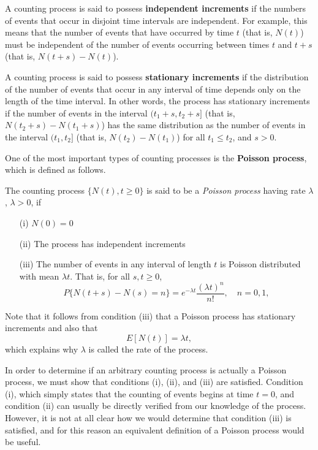 \documentclass[lang=cn,10pt]{elegantbook}
\begin{document}
A counting process is said to possess \textbf{independent increments} if the numbers of events that occur in disjoint time intervals are independent. For example, this means that the number of events that have occurred by time \(t\) (that is, \(N(t)\)) must be independent of the number of events occurring between times \(t\) and \(t + s\) (that is, \(N(t + s) - N(t)\)).

A counting process is said to possess \textbf{stationary increments} if the distribution of the number of events that occur in any interval of time depends only on the length of the time interval. In other words, the process has stationary increments if the number of events in the interval \((t_1 + s, t_2 + s]\) (that is, \(N(t_2 + s) - N(t_1 + s)\)) has the same distribution as the number of events in the interval \((t_1, t_2]\) (that is, \(N(t_2) - N(t_1)\)) for all \(t_1 \leq t_2\), and \(s > 0\).

One of the most important types of counting processes is the \textbf{Poisson process}, which is defined as follows.
\begin{definition}
The counting process $\{N(t), t \geq 0\}$ is said to be a \textit{Poisson process} having rate $\lambda$, $\lambda > 0$, if

\begin{itemize}
    \item[(i)] $N(0) = 0$
    \item[(ii)] The process has independent increments
    \item[(iii)] The number of events in any interval of length $t$ is Poisson distributed with mean $\lambda t$. That is, for all $s, t \geq 0$,
    \begin{equation}
    P\{N(t+s) - N(s) = n\} = e^{-\lambda t} \frac{(\lambda t)^n}{n!}, \quad n = 0, 1,
    \end{equation}
\end{itemize}
\end{definition}

Note that it follows from condition (iii) that a Poisson process has stationary increments and also that
\[
E[N(t)] = \lambda t,
\]
which explains why \(\lambda\) is called the rate of the process.

In order to determine if an arbitrary counting process is actually a Poisson process, we must show that conditions (i), (ii), and (iii) are satisfied. Condition (i), which simply states that the counting of events begins at time \(t = 0\), and condition (ii) can usually be directly verified from our knowledge of the process. However, it is not at all clear how we would determine that condition (iii) is satisfied, and for this reason an equivalent definition of a Poisson process would be useful.
\end{document}
